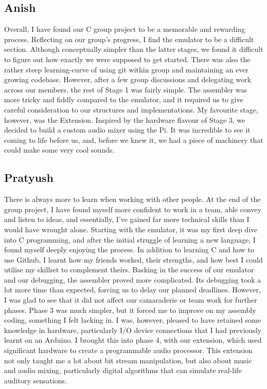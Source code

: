 \documentclass{article}
\begin{document}
\subsection{Anish}

Overall, I have found our C group project to be a memorable and rewarding process. Reflecting on our group's progress, I find the emulator to be a difficult section. Although conceptually simpler than the latter stages, we found it difficult to figure out how exactly we were supposed to get started. There was also the rather steep learning-curve of using git within group and maintaining an ever growing codebase. However, after a few group discussions and delegating work across our members, the rest of Stage 1 was fairly simple. The assembler was more tricky and fiddly compared to the emulator, and it required us to give careful consideration to our structures and implementations. My favourite stage, however, was the Extension. Inspired by the hardware flavour of Stage 3, we decided to build a custom audio mixer using the Pi. It was incredible to see it coming to life before us, and, before we knew it, we had a piece of machinery that could make some very cool sounds. 

\subsection{Pratyush}
There is always more to learn when working with other people. At the end of the group project, I have found myself more confident to work in a team, able convey and listen to ideas, and essentially, I’ve gained far more technical skills than I would have wrought alone. Starting with the emulator, it was my first deep dive into C programming, and after the initial struggle of learning a new language, I found myself deeply enjoying the process. In addition to learning C and how to use Github, I learnt how my friends worked, their strengths, and how best I could utilise my skillset to complement theirs. Basking in the success of our emulator and our debugging, the assembler proved more complicated. Its debugging took a lot more time than expected, forcing us to delay our planned deadlines. However, I was glad to see that it did not affect our camaraderie or team work for further phases. Phase 3 was much simpler, but it forced me to improve on my assembly coding, something I felt lacking in. I was, however, pleased to have retained some knowledge in hardware, particularly I/O device connections that I had previously learnt on an Arduino. I brought this into phase 4, with our extension, which used significant hardware to create a programmable audio processor. This extension not only taught me a lot about bit stream manipulation, but also about music and audio mixing, particularly digital algorithms that can simulate real-life auditory sensations.
\end{document}
